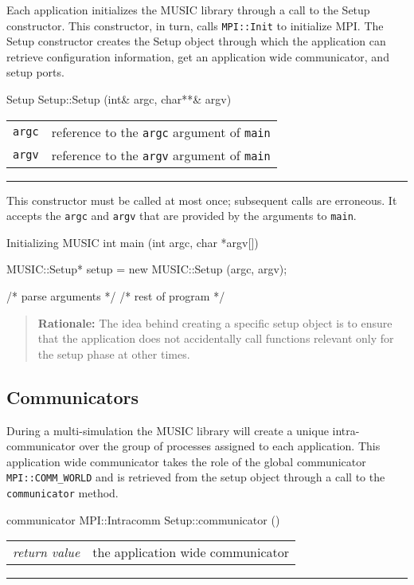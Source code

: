 \documentclass[a4paper,twoside]{report}
\makeatletter
\newenvironment{rationale}%
{\par\begin{quote}\textbf{Rationale:}}%
{\par\end{quote}}
\newenvironment{parameters}%
{\begin{tabular}{@{\hspace{2em}}lp{0.6\textwidth}}}%
{\end{tabular}\par\vspace{1mm}\par\hrule\par\vspace{5mm}}
\makeatother
\begin{document}
Each application initializes the MUSIC library through a call to the
Setup constructor.  This constructor, in turn, calls
\lstinline|MPI::Init| to initialize
MPI.  The Setup constructor creates the Setup
object through which the application can retrieve configuration
information, get an application wide communicator, and setup ports.

\begin{head}{Setup}
  Setup::Setup (int& argc, char**& argv)
\end{head}
\begin{parameters}
  \lstinline|argc| &%
  reference to the \lstinline|argc| argument of \lstinline|main| \\
  \lstinline|argv| &%
  reference to the \lstinline|argv| argument of \lstinline|main| \\
\end{parameters}

This constructor must be called at most once; subsequent calls are
erroneous.  It accepts the \lstinline|argc| and \lstinline|argv| that are
provided by the arguments to \lstinline|main|.

\begin{code}{Initializing MUSIC}
int main (int argc, char *argv[])
{
  MUSIC::Setup* setup = new MUSIC::Setup (argc, argv);

  /* parse arguments */
  /* rest of program */
}
\end{code}

\begin{rationale}
  The idea behind creating a specific setup object is to ensure that
  the application does not accidentally call functions relevant only
  for the setup phase at other times.
\end{rationale}


\subsection{Communicators}

During a multi-simulation the MUSIC library will create a unique
intra-communi\-cator over the group of processes assigned to each
application.  This application wide communicator takes the role of the
global communicator \lstinline|MPI::COMM_WORLD| and is retrieved from
the setup object through a call to the \lstinline|communicator|
method.

\begin{head}{communicator}
  MPI::Intracomm Setup::communicator ()
\end{head}
\begin{parameters}
  \emph{return value} & the application wide communicator \\
\end{parameters}
\end{document}
